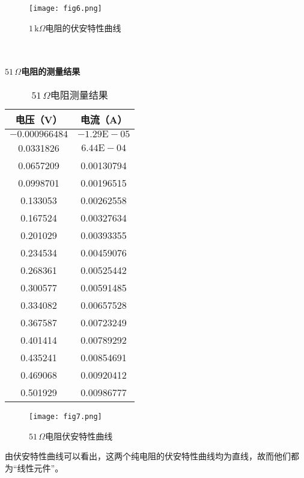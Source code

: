 \documentclass[UTF-8,twoside,cs4size]{ctexart}
\begin{document}
	\begin{figure}[h]
		\centering
		\texttt{[image: fig6.png]}
		\caption{\small $ 1\,\mathrm k\Omega $电阻的伏安特性曲线}
	\end{figure}

~\\

~\\

	\textbf{$ 51\,\Omega $电阻的测量结果}
	\begin{table}[h]
		\centering
		\begin{tabular}{|c|c|}
			\hline
			电压（V） & 电流（A）\\
			\hline
			$ -0.000966484 $ & $ -1.29\mathrm E-05 $\\
			\hline
			0.0331826 & $ 6.44\mathrm E-04 $\\
			\hline
			0.0657209 & 0.00130794\\
			\hline
			0.0998701 & 0.00196515\\
			\hline
			0.133053 & 0.00262558\\
			\hline
			0.167524 & 0.00327634\\
			\hline
			0.201029 & 0.00393355\\
			\hline
			0.234534 & 0.00459076\\
			\hline
			0.268361 & 0.00525442\\
			\hline
			0.300577 & 0.00591485\\
			\hline
			0.334082 & 0.00657528\\
			\hline
			0.367587 & 0.00723249\\
			\hline
			0.401414 & 0.00789292\\
			\hline
			0.435241 & 0.00854691\\
			\hline
			0.469068 & 0.00920412\\
			\hline
			0.501929 & 0.00986777\\
			\hline
		\end{tabular}
		\caption{\small $ 51\,\Omega $电阻测量结果}
	\end{table}

	\begin{figure}[h]
		\centering
		\texttt{[image: fig7.png]}
		\caption{\small $ 51\,\Omega $电阻伏安特性曲线}
	\end{figure}

	由伏安特性曲线可以看出，这两个纯电阻的伏安特性曲线均为直线，故而他们都为“线性元件”。
	
~\\
\end{document}
